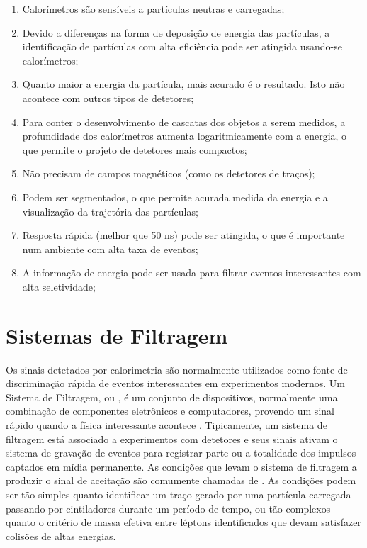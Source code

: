 \begin{enumerate}
\item Calorímetros são sensíveis a partículas neutras e carregadas;

\item Devido a diferenças na forma de deposição de energia das partículas, a
identificação de partículas com alta eficiência pode ser atingida usando-se
calorímetros;

\item Quanto maior a energia da partícula, mais acurado é o resultado. Isto não
acontece com outros tipos de detetores;

\item Para conter o desenvolvimento de cascatas dos objetos a serem medidos, a
profundidade dos calorímetros aumenta logaritmicamente com a energia, o que
permite o projeto de detetores mais compactos;

\item Não precisam de campos magnéticos (como os detetores de traços);

\item Podem ser segmentados, o que permite acurada medida da energia e a
visualização da tra\-je\-tó\-ria das par\-tí\-cu\-las;

\item Resposta rápida (melhor que 50 ns) pode ser atingida, o que é importante
num ambiente com alta taxa de eventos;

\item A informação de energia pode ser usada para filtrar eventos interessantes
com alta seletividade;
\end{enumerate}

\section{Sistemas de Filtragem}
\label{sec:trigger}

Os sinais detetados por calorimetria são normalmente utilizados como fonte de
discriminação rápida de eventos interessantes em experimentos modernos. Um
Sistema de Filtragem, ou , é um conjunto de dispositivos,
normalmente uma combinação de componentes eletrônicos e computadores, provendo
um sinal rápido quando a física interessante acontece
\cite{cms-trigger, d0-trigger, d0-trigger2, hlt-tdr, trig-review,
bock:detector}. Tipicamente, um sistema de filtragem está associado a
experimentos com detetores e seus sinais ativam o sistema de gravação de
eventos para registrar parte ou a totalidade dos impulsos captados em mídia
permanente. As condições que levam o sistema de filtragem a produzir o sinal
de aceitação são comumente chamadas de
. As condições podem ser tão simples quanto
identificar um traço gerado por uma partícula carregada passando por
cintiladores durante um período de tempo, ou tão complexos quanto o critério
de massa efetiva entre léptons identificados que devam satisfazer colisões de
altas energias.

